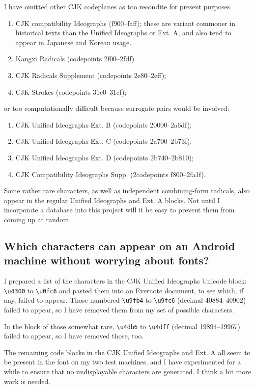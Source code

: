 \documentclass[11pt,asymmetric]{article}
\begin{document}
I have omitted other CJK codeplanes as too recondite for present purposes\begin{enumerate}
\item CJK compatibility Ideographs (f900--faff); these are variant commoner in historical texts than the Unified Ideographs or Ext. A, and also tend to appear in Japanese and Korean usage.
\item Kangxi Radicals (codepoints 2f00--2fdf)
\item CJK Radicals Supplement (codepoints 2e80--2eff);
\item CJK Strokes (codepoints 31c0--31ef);
\end{enumerate}
or too computationally difficult because surrogate pairs would be involved:\begin{enumerate}
\item CJK Unified Ideographs Ext. B (codepoints 20000--2a6df);
\item CJK Unified Ideographs Ext. C (codepoints 2a700--2b73f);
\item CJK Unified Ideographs Ext. D (codepoints 2b740--2b810);
\item CJK Compatibility Ideographs Supp. (2codepoints f800--2fa1f).
\end{enumerate}
Some rather rare characters, as well as independent combining-form radicals, also appear in the regular Unified Ideographs and Ext. A blocks. Not until I incorporate a database into this project will it be easy to prevent them from coming up at random.


\subsection{Which characters can appear on an Android machine without worrying about fonts?}
I prepared a list of the characters in the CJK Unified Ideographs Unicode block: \texttt{\textbackslash u4300} to \texttt{\textbackslash u0fc6} and pasted them into an Evernote document, to see which, if any, failed to appear. Those numbered \texttt{\textbackslash u9fb4} to \texttt{\textbackslash u9fc6} (decimal 40884--40902) failed to appear, so I have removed them from my set of possible characters. 

In the block of those somewhat rare, \texttt{\textbackslash u4db6} to \texttt{\textbackslash u4dff} (decimal 19894--19967) failed to appear, so I have removed those, too.

The remaining code blocks in the CJK Unified Ideographs and Ext. A all seem to be present in the font on my two test machines, and I have experimented for a while to ensure that no undisplayable characters are generated. I think a bit more work is needed.
\end{document}
